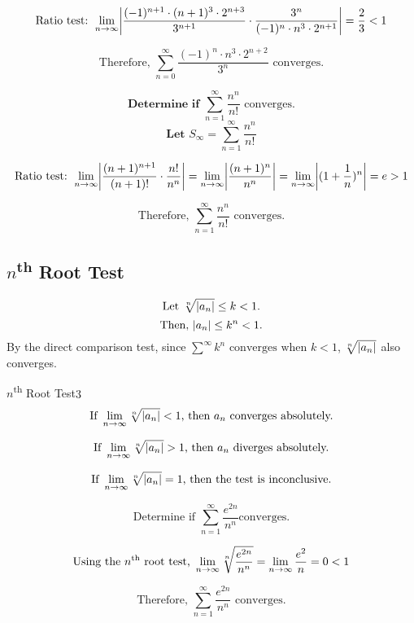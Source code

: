 \documentclass[10pt]{article}
\theoremstyle{definition}
\DeclarePairedDelimiter{\abs}{\lvert}{\rvert}
\begin{document}
\[\text{Ratio test: } \lim_{n \to \infty} \abs*{\frac{(-1)^{n+1} \cdot (n+1)^3 \cdot 2^{n+3}}{3^{n+1}} \cdot \frac{3^n}{(-1)^n \cdot n^3 \cdot 2^{n+1}}} = \frac{2}{3} < 1\]

\[\text{Therefore, }\sum_{n=0}^{\infty} \frac{(-1)^n \cdot n^3 \cdot 2^{n+2}}{3^n} \text{ converges.}\]


\vspace{0.5cm}

\[ \textbf{Determine if } \sum_{n=1}^{\infty} \frac{n^n}{n!} \text{ converges.} \]
\[ \textbf{Let } S_\infty=\sum_{n=1}^{\infty} \frac{n^n}{n!}\]

\[\text{Ratio test: }\lim_{n \to \infty} \abs*{  \frac{(n+1)^{n+1}}{(n+1)!} \cdot \frac{n!}{n^n}}
= \lim_{n \to \infty} \abs*{ \frac{(n+1)^n}{n^n}} = \lim_{n \to \infty} \abs*{(1+\frac{1}{n})^n} = e > 1\]

\[\text{Therefore, }\sum_{n=1}^{\infty} \frac{n^n}{n!} \text{ converges.}\]




\subsection{$n$\textsuperscript{th} Root Test}

\[\text{Let } \sqrt[n]{\abs{a_n}} \le k < 1.\]
\[\text{Then, } \abs{a_n} \le k^n < 1.\]
By the direct comparison test,  since $\sum^{\infty}k^n \text{ converges when } k<1$, $\sqrt[n]{\abs{a_n}}$ also converges.

\begin{theorem}{$n$\textsuperscript{th} Root Test}{3}
\[\text{If } \lim_{n \to \infty} \sqrt[n]{\abs*{a_n}} < 1 \text{, then } a_n \text{ converges absolutely.} \]

\[\text{If } \lim_{n \to \infty} \sqrt[n]{\abs*{a_n}} > 1 \text{, then } a_n \text{ diverges absolutely.} \]

\[\text{If } \lim_{n \to \infty} \sqrt[n]{\abs*{a_n}} = 1 \text{, then the test is inconclusive.}\]
\end{theorem}

\[\text{Determine if }\sum_{n=1}^{\infty} \frac{e^{2n}}{n^n}\text{converges.}\]


\[\text{Using the $n$\textsuperscript{th} root test, }\lim_{n \to \infty} \sqrt[n]{\frac{e^{2n}}{n^n}} = \lim_{n \to \infty} \frac{e^2}{n} = 0 < 1\]

\[\text{Therefore, }\sum_{n=1}^{\infty} \frac{e^{2n}}{n^n} \text{ converges.}\]

\newpage
\end{document}
